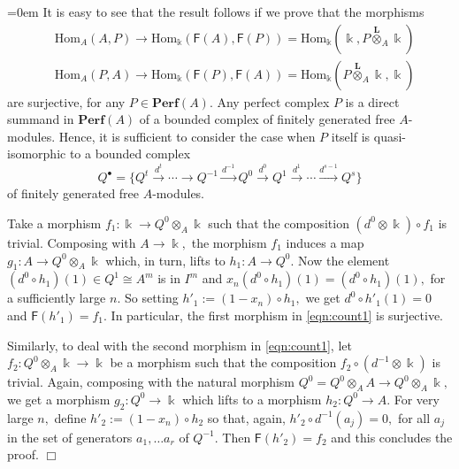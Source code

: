 \documentclass[a4paper,11pt,twoside]{amsart}
\numberwithin{equation}{section}
\theoremstyle{definition}
\renewenvironment{proof}{\par\vspace{-5pt}\par\noindent\begingroup\leftskip=0em\hspace{0em}{\bf Proof.}}{\endgroup\hfill$\Box$}
\begin{document}
\begin{proof}
It is easy to see that the result follows if we prove that the morphisms
\begin{equation}\label{eqn:count1}
\begin{split}
&{\mathrm{Hom}}_A(A,P)\longrightarrow{\mathrm{Hom}}_{\Bbbk}({\mathsf{{F}}}(A),{\mathsf{{F}}}(P))={\mathrm{Hom}}_{\Bbbk}({\Bbbk},P\stackrel{\mathbf L}{\otimes}_A{\Bbbk})\\
&{\mathrm{Hom}}_A(P,A)\longrightarrow{\mathrm{Hom}}_{\Bbbk}({\mathsf{{F}}}(P),{\mathsf{{F}}}(A))={\mathrm{Hom}}_{\Bbbk}(P\stackrel{\mathbf L}{\otimes}_A{\Bbbk},{\Bbbk})
\end{split}
\end{equation}
are surjective, for any $P\in{{{\mathbf{{Perf}}}}}(A).$ Any perfect complex $P$ is
a direct summand in ${{{\mathbf{{Perf}}}}}(A)$ of a bounded complex of finitely generated free $A$-modules.
Hence, it is sufficient to consider the case when $P$ itself is quasi-isomorphic to a bounded complex
\[
{{Q}^{\bullet}}=\{Q^t\stackrel{d^{t}}{\longrightarrow}\cdots\longrightarrow Q^{-1}\stackrel{d^{-1}}{\longrightarrow} Q^{0}\stackrel{d^{0}}{\longrightarrow} Q^{1}\stackrel{d^{1}}{\longrightarrow}\cdots\stackrel{d^{s-1}}{\longrightarrow} Q^s\}
\]
of finitely generated free $A$-modules.

Take a morphism $f_1:{\Bbbk}\to Q^0\otimes_A{\Bbbk}$ such that the
composition $(d^0\otimes{\Bbbk}){\circ} f_1$ is trivial. Composing with
$A\to{\Bbbk},$ the morphism $f_1$ induces a map $g_1:A\to Q^0\otimes_A{\Bbbk}$
which, in turn, lifts to $h_1:A\to Q^0.$ Now the element $(d^0{\circ}
h_1)(1)\in Q^1{\cong} A^m$ is in $I^m$ and $x_n(d^0{\circ}
h_1)(1)=(d^0{\circ} h_1)(1),$ for a sufficiently large $n.$ So setting
$h'_1:=(1-x_n){\circ} h_1,$ we get $d^0{\circ} h'_1(1)=0$ and
${\mathsf{{F}}}(h'_1)=f_1.$ In particular, the first morphism in
\eqref{eqn:count1} is surjective.

Similarly, to deal with the second morphism in \eqref{eqn:count1}, let
$f_2:Q^0\otimes_A{\Bbbk}\to{\Bbbk}$ be a morphism such that the composition
$f_2{\circ}(d^{-1}\otimes{\Bbbk})$ is trivial. Again, composing with the
natural morphism $Q^0=Q^0\otimes_A A\to Q^0\otimes_A{\Bbbk},$ we get a
morphism $g_2:Q^0\to{\Bbbk}$ which lifts to a morphism $h_2:Q^0\to A.$ For
very large $n,$ define $h'_2:=(1-x_n){\circ} h_2$ so that, again,
$h'_2{\circ} d^{-1}(a_j)=0,$ for all $a_j$ in the set of generators
$a_1,\ldots a_r$ of $Q^{-1}.$ Then ${\mathsf{{F}}}(h'_2)=f_2$ and this
concludes the proof.
\end{proof}
\end{document}
